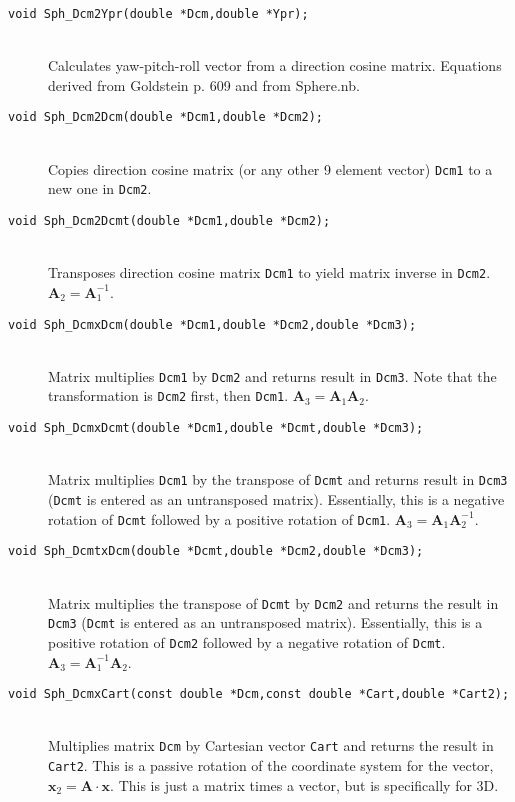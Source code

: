\documentclass[11pt]{article}
\newcommand {\ttt} {\texttt}
\begin{document}
\begin{description}
\item[\ttt{void Sph\_Dcm2Ypr(double *Dcm,double *Ypr);}]
\hfill \\
Calculates yaw-pitch-roll vector from a direction cosine matrix. Equations derived from Goldstein p. 609 and from Sphere.nb.


\item[\ttt{void Sph\_Dcm2Dcm(double *Dcm1,double *Dcm2);}]
\hfill \\
Copies direction cosine matrix (or any other 9 element vector) \ttt{Dcm1} to a new one in \ttt{Dcm2}.


\item[\ttt{void Sph\_Dcm2Dcmt(double *Dcm1,double *Dcm2);}]
\hfill \\
Transposes direction cosine matrix \ttt{Dcm1} to yield matrix inverse in \ttt{Dcm2}. $\bm{A}_2 = \bm{A}_1^{-1}$.


\item[\ttt{void Sph\_DcmxDcm(double *Dcm1,double *Dcm2,double *Dcm3);}]
\hfill \\
Matrix multiplies \ttt{Dcm1} by \ttt{Dcm2} and returns result in \ttt{Dcm3}. Note that the transformation is \ttt{Dcm2} first, then \ttt{Dcm1}. $\bm{A}_3 = \bm{A}_1\bm{A}_2$.


\item[\ttt{void Sph\_DcmxDcmt(double *Dcm1,double *Dcmt,double *Dcm3);}]
\hfill \\
Matrix multiplies \ttt{Dcm1} by the transpose of \ttt{Dcmt} and returns result in \ttt{Dcm3} (\ttt{Dcmt} is entered as an untransposed matrix). Essentially, this is a negative rotation of \ttt{Dcmt} followed by a positive rotation of \ttt{Dcm1}. $\bm{A}_3 = \bm{A}_1\bm{A}_2^{-1}$.


\item[\ttt{void Sph\_DcmtxDcm(double *Dcmt,double *Dcm2,double *Dcm3);}]
\hfill \\
Matrix multiplies the transpose of \ttt{Dcmt} by \ttt{Dcm2} and returns the result in \ttt{Dcm3} (\ttt{Dcmt} is entered as an untransposed matrix). Essentially, this is a positive rotation of \ttt{Dcm2} followed by a negative rotation of \ttt{Dcmt}. $\bm{A}_3 = \bm{A}_1^{-1}\bm{A}_2$.


\item[\ttt{void Sph\_DcmxCart(const double *Dcm,const double *Cart,double *Cart2);}]
\hfill \\
Multiplies matrix \ttt{Dcm} by Cartesian vector \ttt{Cart} and returns the result in \ttt{Cart2}. This is a passive rotation of the coordinate system for the vector, $\bm{x}_2 = \bm{A}\cdot \bm{x}$. This is just a matrix times a vector, but is specifically for 3D.



\end{description}
\end{document}
